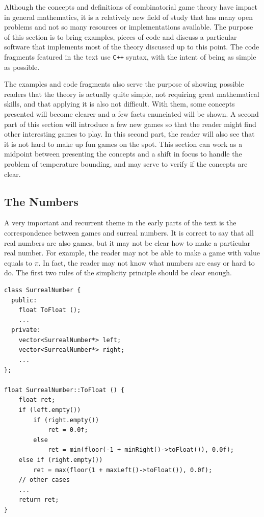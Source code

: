 Although the concepts and definitions of combinatorial game theory have impact in general mathematics, it is a relatively new field of study that has many open problems and not so many resources or implementations available. The purpose of this section is to bring examples, pieces of code and discuss a particular software that implements most of the theory discussed up to this point. The code fragments featured in the text use \texttt{C++} syntax, with the intent of being as simple as possible.

The examples and code fragments also serve the purpose of showing possible readers that the theory is actually quite simple, not requiring great mathematical skills, and that applying it is also not difficult. With them, some concepts presented will become clearer and a few facts enunciated will be shown. A second part of this section will introduce a few new games so that the reader might find other interesting games to play. In this second part, the reader will also see that it is not hard to make up fun games on the spot. This section can work as a midpoint between presenting the concepts and a shift in focus to handle the problem of temperature bounding, and may serve to verify if the concepts are clear.

\subsection*{The Numbers}

A very important and recurrent theme in the early parts of the text is the correspondence between games and surreal numbers. It is correct to say that all real numbers are also games, but it may not be clear how to make a particular real number. For example, the reader may not be able to make a game with value equals to $\pi$. In fact, the reader may not know what numbers are easy or hard to do. The first two rules of the simplicity principle should be clear enough.

\begin{verbatim}
class SurrealNumber {
  public:
	float ToFloat ();
	...
  private:
  	vector<SurrealNumber*> left;
  	vector<SurrealNumber*> right;
  	...
};

float SurrealNumber::ToFloat () {
	float ret;
	if (left.empty())
		if (right.empty())
			ret = 0.0f;
		else
			ret = min(floor(-1 + minRight()->toFloat()), 0.0f);
	else if (right.empty())
		ret = max(floor(1 + maxLeft()->toFloat()), 0.0f);
	// other cases
	...
	return ret;
}
\end{verbatim}


